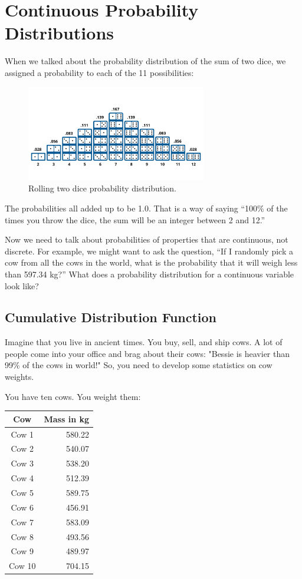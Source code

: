 \chapter{Continuous Probability Distributions}

When we talked about the probability distribution of the sum of two dice,  we assigned a probability to each of the 11 possibilities:
\begin{figure}[htbp]
    \centering
    \includegraphics[width=0.7\textwidth]{dice_histogram.png}
    \caption{Rolling two dice probability distribution.}
    \label{fig:example}
\end{figure}

The probabilities all added up to be 1.0.  That is a way of saying ``100\% of the times you throw the dice,  the sum will be an integer between 2 and 12.''

Now we need to talk about probabilities of properties that are continuous,  not discrete. For example, we might want to ask the question, ``If I randomly pick a cow from all the cows in the 
world, what is the probability that it will weigh less than 597.34 kg?''  What does a probability distribution for a continuous variable look like?

\section{Cumulative Distribution Function}

Imagine that you live in ancient times.  You buy, sell, and ship cows. A lot of people come into your office and brag about their cows: "Bessie is heavier than 99\% of the cows in 
world!"  So, you need to develop some statistics on cow weights.

You have ten cows. You weight them:

\begin{tabular}{c|r}
Cow & Mass in kg \\
\hline
Cow 1 & 580.22 \\
Cow 2 & 540.07 \\
Cow 3 & 538.20 \\
Cow 4 & 512.39 \\
Cow 5 & 589.75 \\
Cow 6 & 456.91 \\
Cow 7 & 583.09 \\
Cow 8 & 493.56 \\
Cow 9 & 489.97 \\
Cow 10 & 704.15 \\
\end{tabular}

